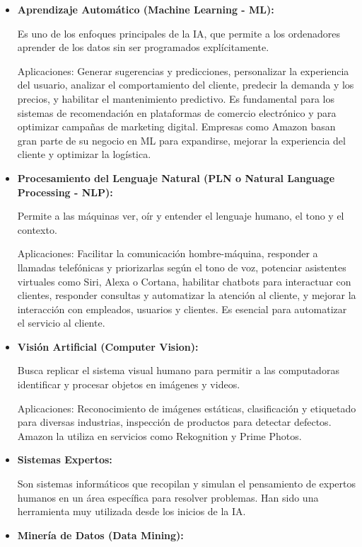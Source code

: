 \documentclass[12pt, a4paper, twoside]{article}
\begin{document}
\begin{itemize}

\item \textbf{Aprendizaje Automático (Machine Learning - ML):} 

Es uno de los enfoques principales de la IA, que permite a los ordenadores aprender de los datos sin ser programados explícitamente.

Aplicaciones: Generar sugerencias y predicciones, personalizar la experiencia del usuario, analizar el comportamiento del cliente, predecir la demanda y los precios, y habilitar el mantenimiento predictivo. Es fundamental para los sistemas de recomendación en plataformas de comercio electrónico y para optimizar campañas de marketing digital. Empresas como Amazon basan gran parte de su negocio en ML para expandirse, mejorar la experiencia del cliente y optimizar la logística.
\item \textbf{Procesamiento del Lenguaje Natural (PLN o Natural Language Processing - NLP):} 

Permite a las máquinas ver, oír y entender el lenguaje humano, el tono y el contexto.

Aplicaciones: Facilitar la comunicación hombre-máquina, responder a llamadas telefónicas y priorizarlas según el tono de voz, potenciar asistentes virtuales como Siri, Alexa o Cortana, habilitar chatbots para interactuar con clientes, responder consultas y automatizar la atención al cliente, y mejorar la interacción con empleados, usuarios y clientes. Es esencial para automatizar el servicio al cliente.

\item \textbf{Visión Artificial (Computer Vision):} 

Busca replicar el sistema visual humano para permitir a las computadoras identificar y procesar objetos en imágenes y videos.

Aplicaciones: Reconocimiento de imágenes estáticas, clasificación y etiquetado para diversas industrias, inspección de productos para detectar defectos. Amazon la utiliza en servicios como Rekognition y Prime Photos.

\item \textbf{Sistemas Expertos:} 

Son sistemas informáticos que recopilan y simulan el pensamiento de expertos humanos en un área específica para resolver problemas. Han sido una herramienta muy utilizada desde los inicios de la IA.
\item \textbf{Minería de Datos (Data Mining):} 


\end{itemize}
\end{document}

